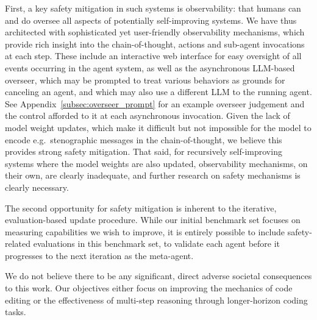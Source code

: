 First, a key safety mitigation in such systems is observability: that humans can and do oversee all aspects of potentially self-improving systems.
We have thus architected  with sophisticated yet user-friendly observability mechanisms, which provide rich insight into the chain-of-thought, actions and sub-agent invocations at each step. These include an interactive web interface for easy oversight of all events occurring in the agent system, as well as the asynchronous LLM-based overseer, which may be prompted to treat various behaviors as grounds for canceling an agent, and which may also use a different LLM to the running agent.
See Appendix~\ref{subsec:overseer_prompt} for an example overseer judgement and
the control afforded to it at each asynchronous invocation.
Given the lack of model weight updates, which make it difficult but not impossible for the model to encode e.g.\ stenographic messages \citep{motwani2023perfect,motwani2024secret} in the chain-of-thought, we believe this provides strong safety mitigation.
That said, for recursively self-improving systems where the model weights are also updated, observability mechanisms, on their own, are clearly inadequate, and further research on safety mechanisms is clearly necessary.

The second opportunity for safety mitigation is inherent to the iterative, evaluation-based update procedure. While our initial benchmark set focuses on measuring capabilities we wish to improve, it is entirely possible to include safety-related evaluations in this benchmark set, to validate each agent before it progresses to the next iteration as the meta-agent.

We do not believe there to be any significant, direct adverse societal
consequences to this work. Our objectives either focus on improving the
mechanics of code editing or the effectiveness of multi-step reasoning through
longer-horizon coding tasks.
